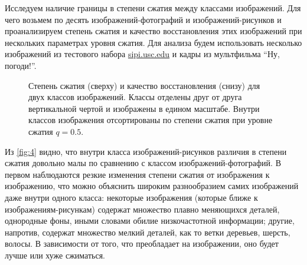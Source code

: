 \documentclass[12pt,a4paper]{article}
\begin{document}
            Исследуем наличие границы в степени сжатия между классами изображений. Для чего возьмем по десять изображений-фотографий и изображений-рисунков и проанализируем степень сжатия и качество восстановления этих изображений при нескольких параметрах уровня сжатия. Для анализа будем использовать несколько изображений из тестового набора \url{sipi.usc.edu} и кадры из мультфильма \enquote{Ну, погоди!}.
            \begin{figure}[!htb]%
                \centering
                \hspace{8pt}%
                \hspace{8pt}%
                \caption[]{Степень сжатия (сверху) и качество восстановления (снизу) для двух классов изображений. Классы отделены друг от друга вертикальной чертой и изображены в едином масштабе. Внутри классов изображения отсортированы по степени сжатия при уровне сжатия $q = 0.5$.}%
                \label{fig:4}%
            \end{figure}
            Из \autoref{fig:4} видно, что внутри класса изображений-рисунков различия в степени сжатия довольно малы по сравнению с классом изображений-фотографий. В первом наблюдаются резкие изменения степени сжатия от изображения к изображению, что можно объяснить широким разнообразием самих изображений даже внутри одного класса: некоторые изображения (которые ближе к изображениям-рисункам) содержат множество плавно меняющихся деталей, однородные фоны, иными словами обилие низкочастотной информации; другие, напротив, содержат множество мелкий деталей, как то ветки деревьев, шерсть, волосы. В зависимости от того, что преобладает на изображении, оно будет лучше или хуже сжиматься.
\end{document}
